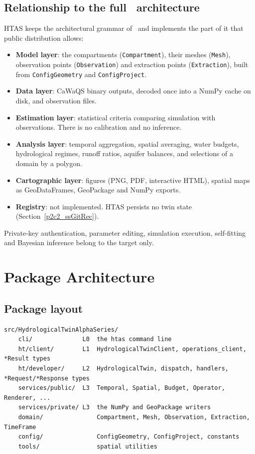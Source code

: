 \subsection{Relationship to the full \hydrot\ architecture}

HTAS keeps the architectural grammar of \hydrot\ and implements the part of it
that public distribution allows:

\begin{itemize}
    \item \textbf{Model layer}: the compartments (\texttt{Compartment}), their meshes (\texttt{Mesh}), observation points (\texttt{Observation}) and extraction points (\texttt{Extraction}), built from \texttt{ConfigGeometry} and \texttt{ConfigProject}.
    \item \textbf{Data layer}: CaWaQS binary outputs, decoded once into a NumPy cache on disk, and observation files.
    \item \textbf{Estimation layer}: statistical criteria comparing simulation with observations. There is no calibration and no inference.
    \item \textbf{Analysis layer}: temporal aggregation, spatial averaging, water budgets, hydrological regimes, runoff ratios, aquifer balances, and selections of a domain by a polygon.
    \item \textbf{Cartographic layer}: figures (PNG, PDF, interactive HTML), spatial maps as GeoDataFrames, GeoPackage and NumPy exports.
    \item \textbf{Registry}: not implemented. HTAS persists no twin state (Section~\ref{p2c2_ssGitRec}).
\end{itemize}

Private-key authentication, parameter editing, simulation execution,
self-fitting and Bayesian inference belong to the target only.


\section{Package Architecture}

\subsection{Package layout}

\begin{verbatim}
src/HydrologicalTwinAlphaSeries/
    cli/              L0  the htas command line
    ht/client/        L1  HydrologicalTwinClient, operations_client, *Result types
    ht/developer/     L2  HydrologicalTwin, dispatch, handlers, *Request/*Response types
    services/public/  L3  Temporal, Spatial, Budget, Operator, Renderer, ...
    services/private/ L3  the NumPy and GeoPackage writers
    domain/               Compartment, Mesh, Observation, Extraction, TimeFrame
    config/               ConfigGeometry, ConfigProject, constants
    tools/                spatial utilities
\end{verbatim}

